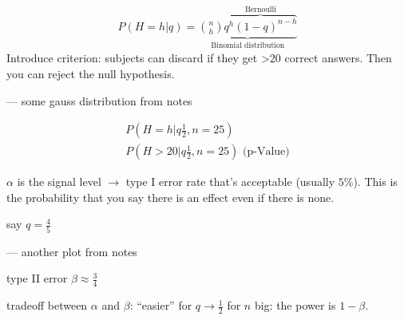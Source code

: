 \begin{align*}
P(H=h|q) = \underbrace{ \binom{n}{h} \overbrace{q^h (1-q)^{n-h}}^\text{Bernoulli} }_\text{Binomial distribution}
\end{align*}
Introduce criterion: subjects can discard if they get >20 correct answers. Then you can reject the null hypothesis.

--- some gauss distribution from notes

\begin{align*}
P\left(H=h|q\frac{1}{2},n=25\right) \\
P\left(H>20|q\frac{1}{2},n=25\right) \mbox{ (p-Value)}
\end{align*}

$\alpha$ is the signal level $\rightarrow$ type I error rate that's acceptable (usually $5\%$). This is the probability that you say there is an effect even if there is none.

say $q = \frac{4}{5}$

--- another plot from notes

type II error $\beta \approx \frac{3}{4}$

tradeoff between $\alpha$ and $\beta$: ``easier'' for $q \rightarrow \frac{1}{2}$ for $n$ big: the power is $1-\beta$.
